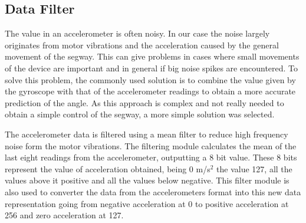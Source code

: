 \subsection{Data Filter}

The value in an accelerometer is often noisy.
In our case the noise largely originates from motor vibrations and the acceleration caused by the general movement of the segway.
This can give problems in cases where small movements of the device are important and in general if big noise spikes are encountered.
To solve this problem, the commonly used solution is to combine the value given by the gyroscope with that of the accelerometer readings to obtain a more accurate prediction of the angle.
As this approach is complex and not really needed to obtain a simple control of the segway, a more simple solution was selected.

The accelerometer data is filtered using a mean filter to reduce high frequency noise form the motor vibrations.
The filtering module calculates the mean of the last eight readings from the accelerometer, outputting a 8 bit value.
These 8 bits represent the value of acceleration obtained, being 0 m/s$^{2}$ the value 127, all the values above it positive and all the values below negative.
This filter module is also used to converter the data from the accelerometers format into this new data representation going from negative acceleration at 0 to positive acceleration at 256 and zero acceleration at 127.